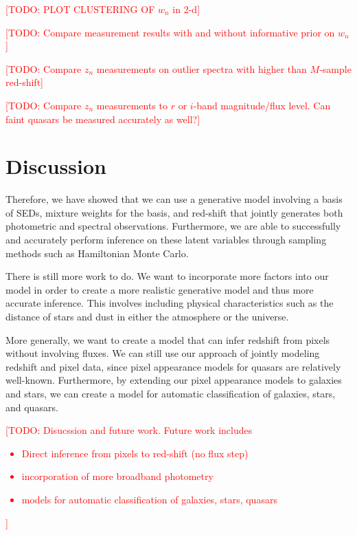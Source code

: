\documentclass{article}
\newcommand{\red}[1]{\textcolor{red}{[TODO: #1]}}
\begin{document}
\red{PLOT CLUSTERING OF $w_n$ in 2-d}

\red{Compare measurement results with and without informative prior on $w_n$}

\red{Compare $z_n$ measurements on outlier spectra with higher than $M$-sample red-shift}

\red{Compare $z_n$ measurements to $r$ or $i$-band magnitude/flux level.  Can faint quasars be measured accurately as well?}

\section{Discussion}

Therefore, we have showed that we can use a generative model involving a basis
of SEDs, mixture weights for the basis, and red-shift
that jointly generates both photometric and spectral observations. Furthermore, we are able
to successfully and accurately perform inference on these latent variables through sampling methods
such as Hamiltonian Monte Carlo.
 
There is still more work to do. We want to incorporate
more factors into our model in order to create a more realistic
generative model and thus more accurate inference. This involves
including physical characteristics such as the distance of stars and dust in either the atmosphere
or the universe.

More generally, we want to create a model that can infer redshift from pixels without
involving fluxes. We can still use our approach of jointly
modeling redshift and pixel data, since pixel appearance models for 
quasars are relatively well-known. Furthermore, by extending our
pixel appearance models to galaxies and stars, we can create
a model for automatic classification of galaxies,
stars, and quasars.

\red{Disucssion and future work.  Future work includes 
\begin{itemize}
  \item Direct inference from pixels to red-shift (no flux step)
  \item incorporation of more broadband photometry
  \item models for automatic classification of galaxies, stars, quasars
\end{itemize}
}
\end{document}
